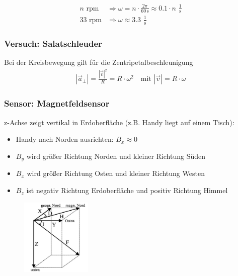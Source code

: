 \documentclass{beamer}
\begin{document}
\begin{frame}
\begin{columns}
\begin{figure}[htpb]
        \end{figure}
    \end{columns}
    \begin{align*}
        n \,\, \text{rpm} &\Rightarrow \omega = n \cdot \frac{2\pi}{60\,\text{s}} \approx 0.1 \cdot n \,\, \frac{1}{\text{s}}\\
        33 \,\, \text{rpm} &\Rightarrow \omega \approx 3.3 \,\, \frac{1}{\text{s}}
    \end{align*}
\end{frame}

\begin{frame}
    \frametitle{Versuch: Salatschleuder}
    Bei der Kreisbewegung gilt für die Zentripetalbeschleunigung
    \begin{align*}
        |\vec{a}_{\perp}| = \frac{|\vec{v}|^2}{R} = R \cdot \omega^2 \quad \text{mit} \,\, |\vec{v}|=R\cdot \omega
    \end{align*}
    
\end{frame}

\begin{frame}
    \frametitle{Sensor: Magnetfeldsensor}
    z-Achse zeigt vertikal in Erdoberfläche (z.B. Handy liegt auf einem Tisch):
    \begin{itemize}
        \item Handy nach Norden ausrichten: $B_x \approx 0$
        \item $B_y$ wird größer Richtung Norden und kleiner Richtung Süden
        \item $B_x$ wird größer Richtung Osten und kleiner Richtung Westen
        \item $B_z$ ist negativ Richtung Erdoberfläche und positiv Richtung Himmel
    \end{itemize}
    \begin{figure}[htpb]
        \centering
        \includegraphics[width=0.3\textwidth]{inklination1}
    \end{figure}
\end{frame}
\end{document}
